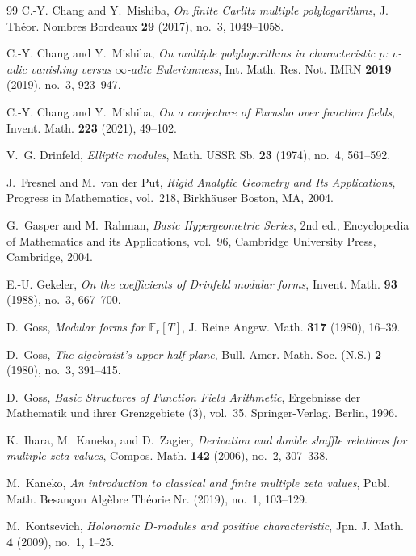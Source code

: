 \documentclass[12pt,reqno]{amsart}
\numberwithin{equation}{section}
\theoremstyle{plain}
\theoremstyle{definition}
\theoremstyle{remark}
\begin{document}
\begin{thebibliography}{99}
C.-Y. Chang and Y.~Mishiba, \emph{On finite Carlitz multiple polylogarithms}, J. Th\'eor. Nombres Bordeaux \textbf{29} (2017), no.~3, 1049--1058.

C.-Y. Chang and Y.~Mishiba, \emph{On multiple polylogarithms in characteristic $p$: $v$-adic vanishing versus $\infty$-adic Eulerianness}, Int. Math. Res. Not. IMRN \textbf{2019} (2019), no.~3, 923--947.

C.-Y. Chang and Y.~Mishiba, \emph{On a conjecture of Furusho over function fields}, Invent. Math. \textbf{223} (2021), 49--102.

V.~G. Drinfeld, \emph{Elliptic modules}, Math. USSR Sb. \textbf{23} (1974), no.~4, 561--592.

J.~Fresnel and M.~van der Put, \emph{Rigid Analytic Geometry and Its Applications}, Progress in Mathematics, vol.~218, Birkh\"auser Boston, MA, 2004.

G.~Gasper and M.~Rahman, \emph{Basic Hypergeometric Series}, 2nd ed., Encyclopedia of Mathematics and its Applications, vol.~96, Cambridge University Press, Cambridge, 2004.

E.-U. Gekeler, \emph{On the coefficients of Drinfeld modular forms}, Invent. Math. \textbf{93} (1988), no.~3, 667--700.

D.~Goss, \emph{Modular forms for {$\mathbb{F}_r[T]$}}, J. Reine Angew. Math. \textbf{317} (1980), 16--39.

D.~Goss, \emph{The algebraist's upper half-plane}, Bull. Amer. Math. Soc. (N.S.) \textbf{2} (1980), no.~3, 391--415.

D.~Goss, \emph{Basic Structures of Function Field Arithmetic}, Ergebnisse der Mathematik und ihrer Grenzgebiete (3), vol.~35, Springer-Verlag, Berlin, 1996.

K.~Ihara, M.~Kaneko, and D.~Zagier, \emph{Derivation and double shuffle relations for multiple zeta values}, Compos. Math. \textbf{142} (2006), no.~2, 307--338.

M.~Kaneko, \emph{An introduction to classical and finite multiple zeta values}, Publ. Math. Besan\c{c}on Alg\`{e}bre Th\'{e}orie Nr. (2019), no.~1, 103--129.

M.~Kontsevich, \emph{Holonomic {$D$}-modules and positive characteristic}, Jpn. J. Math. \textbf{4} (2009), no.~1, 1--25.


\end{thebibliography}
\end{document}
